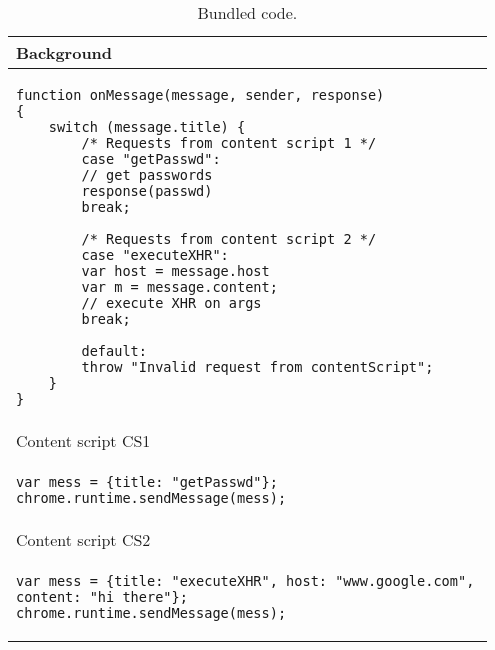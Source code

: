 \begin{table}[tlb]
\begin{small}
\begin{center}
\begin{tabular}{p{0.95\linewidth}}
Background\\
\hline
\begin{lstlisting}
function onMessage(message, sender, response)
{    	
	switch (message.title) {
		/* Requests from content script 1 */
		case "getPasswd":
		// get passwords
		response(passwd)
		break;
		
		/* Requests from content script 2 */
		case "executeXHR":
		var host = message.host
		var m = message.content;
		// execute XHR on args
		break;
				
		default:
		throw "Invalid request from contentScript";
	}
}
\end{lstlisting}\\
\hline
\hline
Content script CS1 \\
\hline
\begin{lstlisting}
var mess = {title: "getPasswd"};
chrome.runtime.sendMessage(mess);
\end{lstlisting}\\
\hline
\hline
Content script CS2\\
\hline
\begin{lstlisting}
var mess = {title: "executeXHR", host: "www.google.com", content: "hi there"};
chrome.runtime.sendMessage(mess);
\end{lstlisting}\\
\end{tabular}
\end{center}
\end{small}
\caption{Bundled code.}
\label{tab:Bundled}
\end{table}
